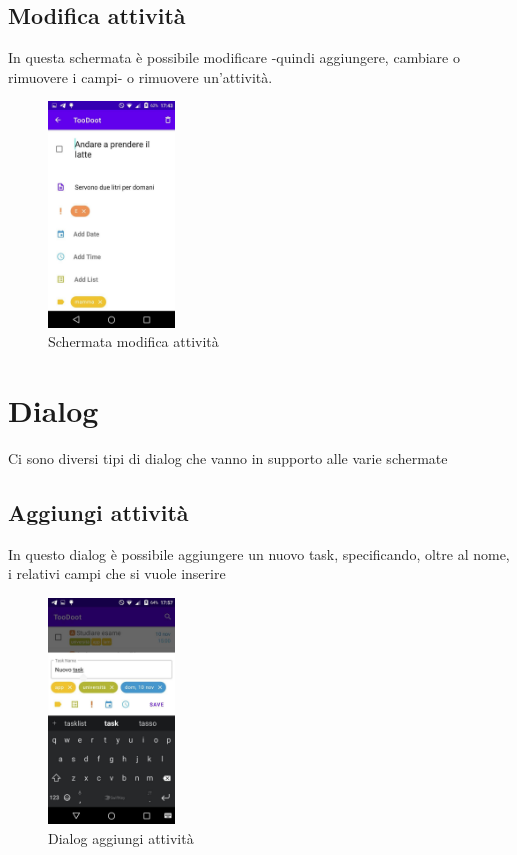 \documentclass[]{article}
\begin{document}
\hypertarget{modifica-attivitaux300}{%
\subsection{Modifica attività}\label{modifica-attivitaux300}}

In questa schermata è possibile modificare -quindi aggiungere, cambiare
o rimuovere i campi- o rimuovere un'attività.

\begin{figure}
\centering
\includegraphics[width=0.3\textwidth,height=0.1\textheight]{./img/schermata_modifica.jpg}
\caption{Schermata modifica attività}
\end{figure}

\hypertarget{dialog}{%
\section{Dialog}\label{dialog}}

Ci sono diversi tipi di dialog che vanno in supporto alle varie
schermate

\hypertarget{aggiungi-attivitaux300}{%
\subsection{Aggiungi attività}\label{aggiungi-attivitaux300}}

In questo dialog è possibile aggiungere un nuovo task, specificando,
oltre al nome, i relativi campi che si vuole inserire

\begin{figure}
\centering
\includegraphics[width=0.3\textwidth,height=0.1\textheight]{./img/dialog_aggiungi.jpg}
\caption{Dialog aggiungi attività}
\end{figure}
\end{document}
